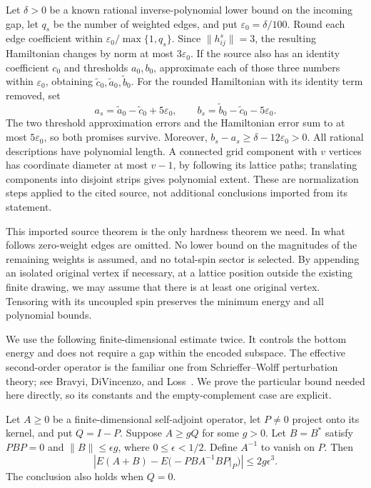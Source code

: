 Let $\delta>0$ be a known rational inverse-polynomial lower bound on the
incoming gap, let $q_s$ be the number of weighted edges, and put
$\varepsilon_0=\delta/100$. Round each edge coefficient within
$\varepsilon_0/\max\{1,q_s\}$. Since $\|h^s_{ij}\|=3$, the resulting
Hamiltonian changes by norm at most $3\varepsilon_0$. If the source also
has an identity coefficient $c_0$ and thresholds $a_0,b_0$, approximate
each of those three numbers within $\varepsilon_0$, obtaining
$\widetilde c_0,\widetilde a_0,\widetilde b_0$. For the rounded Hamiltonian
with its identity term removed, set
\[
 a_s=\widetilde a_0-\widetilde c_0+5\varepsilon_0,
 \qquad
 b_s=\widetilde b_0-\widetilde c_0-5\varepsilon_0.
\]
The two threshold approximation errors and the Hamiltonian error sum to
at most $5\varepsilon_0$, so both promises survive. Moreover,
$b_s-a_s\ge\delta-12\varepsilon_0>0$. All rational descriptions have
polynomial length. A connected grid component with $v$ vertices has
coordinate diameter at most $v-1$, by following its lattice paths;
translating components into disjoint strips gives polynomial extent.
These are normalization steps applied to the cited source, not additional
conclusions imported from its statement.

This imported source theorem is the only hardness theorem we need.
In what follows zero-weight edges are omitted. No lower bound
on the magnitudes of the remaining weights is assumed, and no total-spin
sector is selected.
By appending an isolated original vertex if necessary, at a lattice
position outside the existing finite drawing, we may assume that there
is at least one original vertex.  Tensoring with its uncoupled spin
preserves the minimum energy and all polynomial bounds.

We use the following finite-dimensional estimate twice.  It controls the
bottom energy and does not require a gap within the encoded subspace.
The effective second-order operator is the familiar one from
Schrieffer--Wolff perturbation theory; see
Bravyi, DiVincenzo, and Loss~\cite[Section~3.2]{BravyiDiVincenzoLoss2011}.
We prove the particular bound needed here directly, so its constants and
the empty-complement case are explicit.

\begin{lemma}
\label{lem:second-order}
Let $A\geq0$ be a finite-dimensional self-adjoint operator, let
$P\neq0$ project onto its kernel, and put $Q=I-P$.  Suppose
$A\geq gQ$ for some $g>0$.  Let $B=B^*$ satisfy $PBP=0$ and
$\lVert B\rVert\leq\epsilon g$, where $0\leq\epsilon<1/2$.
Define $A^{-1}$ to vanish on $P$.  Then
\begin{equation}\label{eq:second-order-bound}
 \left|E(A+B)-E\bigl(-PBA^{-1}BP\big|_{P}\bigr)\right|
 \leq 2g\epsilon^3.
\end{equation}
The conclusion also holds when $Q=0$.
\end{lemma}

